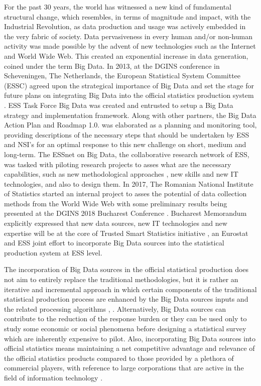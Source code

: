 \documentclass[]{article}
\begin{document}
For the past 30 years, the world has witnessed a new kind of fundamental structural change, which resembles, in terms of magnitude and impact, with the Industrial Revolution, as data production and usage was actively embedded in the very fabric of society. Data pervasiveness in every human and/or non-human activity was made possible by the advent of new technologies such as the Internet and World Wide Web. This created an exponential increase in data generation, coined under the term Big Data. In 2013, at the DGINS conference in Scheveningen, The Netherlands, the European Statistical System  Committee (ESSC) agreed upon the strategical importance of Big Data and set the stage for future plans on integrating Big Data into the official statistics production system \cite{mschv}. ESS Task Force Big Data was created and entrusted to setup a Big Data strategy and implementation framework. Along with other partners, the Big Data Action Plan and Roadmap 1.0. was elaborated as a planning and monitoring tool, providing descriptions of the necessary steps that should be undertaken by ESS and NSI's for an optimal response to this new challenge on short, medium and long-term. The ESSnet on Big Data, the collaborative research network of ESS, was tasked with piloting research projects \cite{awirth_1} to asses what are the necessary capabilities, such as new methodological approaches \cite{fricc}, new skills and new IT technologies, and also to design them. In 2017, The Romanian National Institute of Statistics started an internal project to asses the potential of data collection methods from the World Wide Web with some preliminary results being presented at the DGINS 2018 Bucharest Conference \cite{oancea}. Bucharest Memorandum \cite{mbch} explicitly expressed that new data sources, new IT technologies and new expertise will be at the core of Trusted Smart Statistics initiative \cite{ricwirskagiarei, awirth_2}, an Eurostat and ESS joint effort to incorporate Big Data sources into the statistical production system at ESS level.

The incorporation of Big Data sources in the official statistical production does not aim to entirely replace the traditional methodologies, but it is rather an iterative and incremental approach in which certain components of the traditional statistical production process are enhanced by the Big Data sources inputs and the related processing algorithms \cite{grif2016_1}, \cite{grif2016_2}. Alternatively, Big Data sources can contribute to the reduction of the response burden or they can be used only to study some economic or social phenomena before designing a statistical survey which are inherently expensive to pilot. Also, incorporating Big Data sources into official statistics means maintaining a net competitive advantage and relevance of the official statistics products compared to those provided by a plethora of commercial players, with reference to large corporations that are active in the field of information technology \cite{eu2012}.
\end{document}

